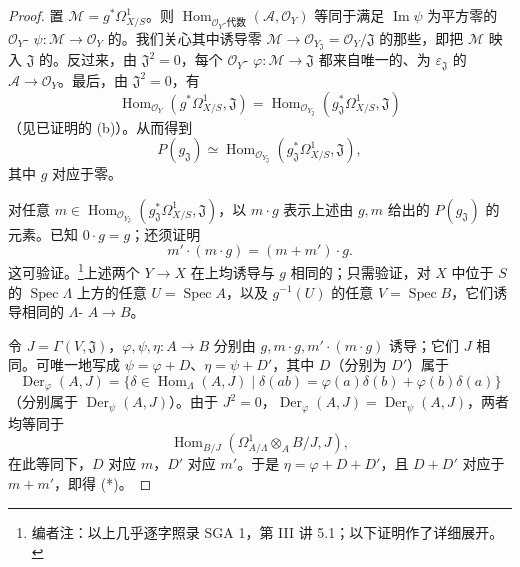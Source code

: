 \begin{proof}
置 $\mathcal M=g^*\Omega^1_{X/S}$。则 $\operatorname{Hom}_{\mathcal O_Y\text{-代数}}(\mathcal A,\mathcal O_Y)$ 等同于满足 $\operatorname{Im}\psi$ 为平方零的 $\mathcal O_Y$- $\psi:\mathcal M\to\mathcal O_Y$ 的。我们关心其中诱导零 $\mathcal M\to\mathcal O_{Y_{\mathfrak J}}=\mathcal O_Y/\mathfrak J$ 的那些，即把 $\mathcal M$ 映入 $\mathfrak J$ 的。反过来，由 $\mathfrak J^2=0$，每个 $\mathcal O_Y$- $\varphi:\mathcal M\to\mathfrak J$ 都来自唯一的、为 $\varepsilon_{\mathfrak J}$ 的 $\mathcal A\to\mathcal O_Y$。最后，由 $\mathfrak J^2=0$，有
\[\operatorname{Hom}_{\mathcal O_Y}(g^*\Omega^1_{X/S},\mathfrak J)=\operatorname{Hom}_{\mathcal O_{Y_{\mathfrak J}}}(g_{\mathfrak J}^*\Omega^1_{X/S},\mathfrak J)\]
（见已证明的 (b)）。从而得到
\[P(g_{\mathfrak J})\simeq\operatorname{Hom}_{\mathcal O_{Y_{\mathfrak J}}}(g_{\mathfrak J}^*\Omega^1_{X/S},\mathfrak J),\]
其中 $g$ 对应于零。

对任意 $m\in\operatorname{Hom}_{\mathcal O_{Y_{\mathfrak J}}}(g_{\mathfrak J}^*\Omega^1_{X/S},\mathfrak J)$，以 $m\cdot g$ 表示上述由 $g,m$ 给出的 $P(g_{\mathfrak J})$ 的元素。已知 $0\cdot g=g$；还须证明
\[m'\cdot(m\cdot g)=(m+m')\cdot g.\tag{0.1.8 (*)}\]
这可验证。\footnote{编者注：以上几乎逐字照录 SGA 1，第 III 讲 5.1；以下证明作了详细展开。}上述两个 $Y\to X$ 在上均诱导与 $g$ 相同的；只需验证，对 $X$ 中位于 $S$ 的 $\operatorname{Spec}\Lambda$ 上方的任意 $U=\operatorname{Spec}A$，以及 $g^{-1}(U)$ 的任意 $V=\operatorname{Spec}B$，它们诱导相同的 $\Lambda$- $A\to B$。

令 $J=\Gamma(V,\mathfrak J)$，$\varphi,\psi,\eta:A\to B$ 分别由 $g,m\cdot g,m'\cdot(m\cdot g)$ 诱导；它们 $J$ 相同。可唯一地写成 $\psi=\varphi+D$、$\eta=\psi+D'$，其中 $D$（分别为 $D'$）属于
\[\operatorname{Der}_{\varphi}(A,J)=\{\delta\in\operatorname{Hom}_{\Lambda}(A,J)\mid\delta(ab)=\varphi(a)\delta(b)+\varphi(b)\delta(a)\}\]
（分别属于 $\operatorname{Der}_{\psi}(A,J)$）。由于 $J^2=0$，$\operatorname{Der}_{\varphi}(A,J)=\operatorname{Der}_{\psi}(A,J)$，两者均等同于
\[\operatorname{Hom}_{B/J}(\Omega^1_{A/\Lambda}\otimes_A B/J,J),\]
在此等同下，$D$ 对应 $m$，$D'$ 对应 $m'$。于是 $\eta=\varphi+D+D'$，且 $D+D'$ 对应于 $m+m'$，即得 (*)。
\end{proof}
